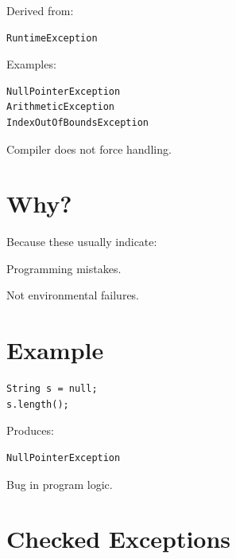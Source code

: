 \documentclass[11pt,a4paper]{book}
\begin{document}
Derived from:

\begin{verbatim} 
RuntimeException
\end{verbatim}


Examples:

\begin{verbatim} 
NullPointerException
ArithmeticException
IndexOutOfBoundsException
\end{verbatim}


Compiler does not force handling.


\section{Why?}

Because these usually indicate:


Programming mistakes.


Not environmental failures.


\section{Example}

\begin{verbatim} 
String s = null;
s.length();
\end{verbatim}


Produces:

\begin{verbatim} 
NullPointerException
\end{verbatim}


Bug in program logic.


\section{Checked Exceptions}
\end{document}
